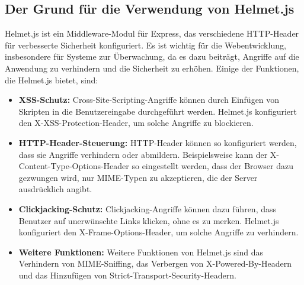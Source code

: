\subsection{Der Grund für die Verwendung von Helmet.js}\label{appendix:a7}\par
Helmet.js ist ein Middleware-Modul für Express, das verschiedene \acs{HTTP}-Header für verbesserte Sicherheit konfiguriert. Es ist wichtig für die Webentwicklung, insbesondere für Systeme zur Überwachung, da es dazu beiträgt, Angriffe auf die Anwendung zu verhindern und die Sicherheit zu erhöhen. Einige der Funktionen, die Helmet.js bietet, sind:
\begin{itemize}
	\item \textbf{XSS-Schutz:} Cross-Site-Scripting-Angriffe können durch Einfügen von Skripten in die Benutzereingabe durchgeführt werden. Helmet.js konfiguriert den X-XSS-Protection-Header, um solche Angriffe zu blockieren.
	\item \textbf{HTTP-Header-Steuerung:} \acs{HTTP}-Header können so konfiguriert werden, dass sie Angriffe verhindern oder abmildern. Beispielsweise kann der X-Content-Type-Options-Header so eingestellt werden, dass der Browser dazu gezwungen wird, nur MIME-Typen zu akzeptieren, die der Server ausdrücklich angibt.
	\item \textbf{Clickjacking-Schutz:} Clickjacking-Angriffe können dazu führen, dass Benutzer auf unerwünschte Links klicken, ohne es zu merken. Helmet.js konfiguriert den X-Frame-Options-Header, um solche Angriffe zu verhindern.
	\item \textbf{Weitere Funktionen:} Weitere Funktionen von Helmet.js sind das Verhindern von MIME-Sniffing, das Verbergen von X-Powered-By-Headern und das Hinzufügen von Strict-Transport-Security-Headern.
\end{itemize}

\clearpage

